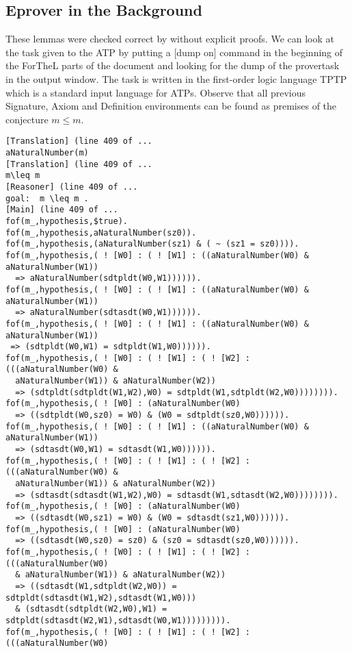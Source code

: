 \documentclass[11pt]{article}
\begin{document}
\subsection{Eprover in the Background}
These lemmas were checked correct by \Naproche without explicit proofs.
We can look at the task given to the ATP by putting
a [dump on] command in the beginning of the ForTheL parts of the
document and looking for the dump of the provertask in the
output window. The task is written in the first-order
logic language TPTP which is a standard input language for ATPs.
Observe that all previous Signature, Axiom and Definition
environments can be found as premises of the
conjecture $m \leq m$.
\begin{scriptsize}
\begin{verbatim}
[Translation] (line 409 of ...
aNaturalNumber(m)
[Translation] (line 409 of ...
m\leq m
[Reasoner] (line 409 of ...
goal:  m \leq m .
[Main] (line 409 of ...
fof(m_,hypothesis,$true).
fof(m_,hypothesis,aNaturalNumber(sz0)).
fof(m_,hypothesis,(aNaturalNumber(sz1) & ( ~ (sz1 = sz0)))).
fof(m_,hypothesis,( ! [W0] : ( ! [W1] : ((aNaturalNumber(W0) & aNaturalNumber(W1))
  => aNaturalNumber(sdtpldt(W0,W1)))))).
fof(m_,hypothesis,( ! [W0] : ( ! [W1] : ((aNaturalNumber(W0) & aNaturalNumber(W1))
  => aNaturalNumber(sdtasdt(W0,W1)))))).
fof(m_,hypothesis,( ! [W0] : ( ! [W1] : ((aNaturalNumber(W0) & aNaturalNumber(W1))
 => (sdtpldt(W0,W1) = sdtpldt(W1,W0)))))).
fof(m_,hypothesis,( ! [W0] : ( ! [W1] : ( ! [W2] : (((aNaturalNumber(W0) &
  aNaturalNumber(W1)) & aNaturalNumber(W2))
  => (sdtpldt(sdtpldt(W1,W2),W0) = sdtpldt(W1,sdtpldt(W2,W0)))))))).
fof(m_,hypothesis,( ! [W0] : (aNaturalNumber(W0)
  => ((sdtpldt(W0,sz0) = W0) & (W0 = sdtpldt(sz0,W0)))))).
fof(m_,hypothesis,( ! [W0] : ( ! [W1] : ((aNaturalNumber(W0) & aNaturalNumber(W1))
  => (sdtasdt(W0,W1) = sdtasdt(W1,W0)))))).
fof(m_,hypothesis,( ! [W0] : ( ! [W1] : ( ! [W2] : (((aNaturalNumber(W0) &
  aNaturalNumber(W1)) & aNaturalNumber(W2))
  => (sdtasdt(sdtasdt(W1,W2),W0) = sdtasdt(W1,sdtasdt(W2,W0)))))))).
fof(m_,hypothesis,( ! [W0] : (aNaturalNumber(W0)
  => ((sdtasdt(W0,sz1) = W0) & (W0 = sdtasdt(sz1,W0)))))).
fof(m_,hypothesis,( ! [W0] : (aNaturalNumber(W0)
  => ((sdtasdt(W0,sz0) = sz0) & (sz0 = sdtasdt(sz0,W0)))))).
fof(m_,hypothesis,( ! [W0] : ( ! [W1] : ( ! [W2] : (((aNaturalNumber(W0)
  & aNaturalNumber(W1)) & aNaturalNumber(W2))
  => ((sdtasdt(W1,sdtpldt(W2,W0)) = sdtpldt(sdtasdt(W1,W2),sdtasdt(W1,W0)))
  & (sdtasdt(sdtpldt(W2,W0),W1) = sdtpldt(sdtasdt(W2,W1),sdtasdt(W0,W1))))))))).
fof(m_,hypothesis,( ! [W0] : ( ! [W1] : ( ! [W2] : (((aNaturalNumber(W0)

\end{verbatim}
\end{scriptsize}
\end{document}
